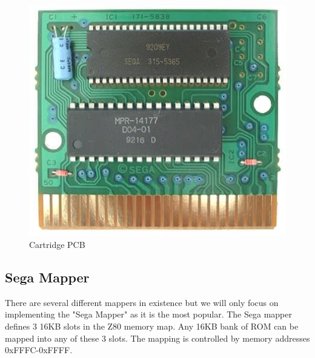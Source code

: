 \documentclass{article}
\begin{document}
\begin{figure}[H]
\begin{minipage}[H]{0.3\linewidth}
        \includegraphics[width=\textwidth]{gg_cart_pcb.png}
        \caption{Cartridge PCB \protect\cite{gg_cart_pcb}}
        \label{fig:gg_cart_pcb}
    \end{minipage}
\end{figure}

\subsection{Sega Mapper}
There are several different mappers in existence but we will only
focus on implementing the "Sega Mapper" as it is the most popular.
The Sega mapper defines 3 16KB slots in the Z80 memory map. Any 16KB bank
of ROM can be mapped into any of these 3 slots. The mapping is
controlled by memory addresses 0xFFFC-0xFFFF.
\end{document}
